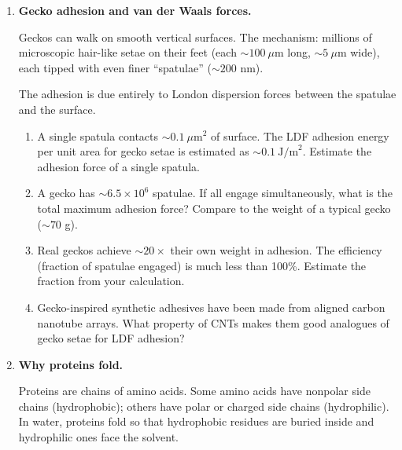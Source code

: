 \documentclass[12pt, a4paper]{book}
\begin{document}
\begin{deepbox}
\begin{enumerate}[label=\textbf{D\arabic*.}]

  \item \textbf{Gecko adhesion and van der Waals forces.}

    Geckos can walk on smooth vertical surfaces.
    The mechanism: millions of microscopic hair-like setae
    on their feet (each $\sim 100\ \mu$m long, $\sim 5\ \mu$m wide),
    each tipped with even finer ``spatulae'' ($\sim 200$ nm).

    The adhesion is due entirely to London dispersion forces
    between the spatulae and the surface.

    \begin{enumerate}[label=(\alph*)]
      \item A single spatula contacts $\sim 0.1\ \mu$m$^2$ of surface.
            The LDF adhesion energy per unit area for gecko
            setae is estimated as $\sim 0.1\ \text{J/m}^2$.
            Estimate the adhesion force of a single spatula.
      \item A gecko has $\sim 6.5 \times 10^6$ spatulae.
            If all engage simultaneously, what is the total
            maximum adhesion force?
            Compare to the weight of a typical gecko
            ($\sim 70$ g).
      \item Real geckos achieve $\sim 20 \times$ their own weight
            in adhesion.
            The efficiency (fraction of spatulae engaged)
            is much less than 100\%.
            Estimate the fraction from your calculation.
      \item Gecko-inspired synthetic adhesives have been made
            from aligned carbon nanotube arrays.
            What property of CNTs makes them good analogues
            of gecko setae for LDF adhesion?
    \end{enumerate}

  \item \textbf{Why proteins fold.}

    Proteins are chains of amino acids.
    Some amino acids have nonpolar side chains (hydrophobic);
    others have polar or charged side chains (hydrophilic).
    In water, proteins fold so that hydrophobic residues
    are buried inside and hydrophilic ones face the solvent.


\end{enumerate}
\end{deepbox}
\end{document}
